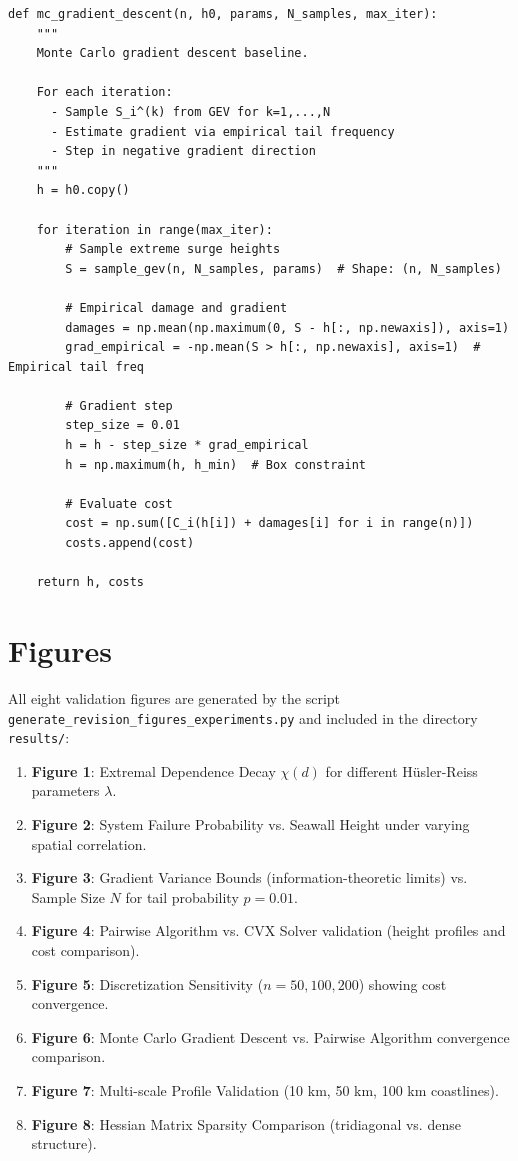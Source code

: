 \documentclass[12pt]{article}
\theoremstyle{definition}
\begin{document}
\begin{verbatim}
def mc_gradient_descent(n, h0, params, N_samples, max_iter):
    """
    Monte Carlo gradient descent baseline.

    For each iteration:
      - Sample S_i^(k) from GEV for k=1,...,N
      - Estimate gradient via empirical tail frequency
      - Step in negative gradient direction
    """
    h = h0.copy()

    for iteration in range(max_iter):
        # Sample extreme surge heights
        S = sample_gev(n, N_samples, params)  # Shape: (n, N_samples)

        # Empirical damage and gradient
        damages = np.mean(np.maximum(0, S - h[:, np.newaxis]), axis=1)
        grad_empirical = -np.mean(S > h[:, np.newaxis], axis=1)  # Empirical tail freq

        # Gradient step
        step_size = 0.01
        h = h - step_size * grad_empirical
        h = np.maximum(h, h_min)  # Box constraint

        # Evaluate cost
        cost = np.sum([C_i(h[i]) + damages[i] for i in range(n)])
        costs.append(cost)

    return h, costs
\end{verbatim}

\section{Figures}

All eight validation figures are generated by the script \texttt{generate\_revision\_figures\_experiments.py} and included in the directory \texttt{results/}:

\begin{enumerate}
    \item \textbf{Figure 1}: Extremal Dependence Decay $\chi(d)$ for different Hüsler-Reiss parameters $\lambda$.
    \item \textbf{Figure 2}: System Failure Probability vs. Seawall Height under varying spatial correlation.
    \item \textbf{Figure 3}: Gradient Variance Bounds (information-theoretic limits) vs. Sample Size $N$ for tail probability $p=0.01$.
    \item \textbf{Figure 4}: Pairwise Algorithm vs. CVX Solver validation (height profiles and cost comparison).
    \item \textbf{Figure 5}: Discretization Sensitivity ($n=50, 100, 200$) showing cost convergence.
    \item \textbf{Figure 6}: Monte Carlo Gradient Descent vs. Pairwise Algorithm convergence comparison.
    \item \textbf{Figure 7}: Multi-scale Profile Validation (10 km, 50 km, 100 km coastlines).
    \item \textbf{Figure 8}: Hessian Matrix Sparsity Comparison (tridiagonal vs. dense structure).
\end{enumerate}
\end{document}
